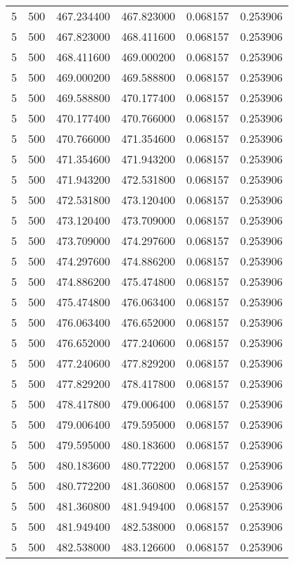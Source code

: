 \begin{longtable}{rrrrrr}
5 & 500 & 467.234400 & 467.823000 & 0.068157 & 0.253906 \\
5 & 500 & 467.823000 & 468.411600 & 0.068157 & 0.253906 \\
5 & 500 & 468.411600 & 469.000200 & 0.068157 & 0.253906 \\
5 & 500 & 469.000200 & 469.588800 & 0.068157 & 0.253906 \\
5 & 500 & 469.588800 & 470.177400 & 0.068157 & 0.253906 \\
5 & 500 & 470.177400 & 470.766000 & 0.068157 & 0.253906 \\
5 & 500 & 470.766000 & 471.354600 & 0.068157 & 0.253906 \\
5 & 500 & 471.354600 & 471.943200 & 0.068157 & 0.253906 \\
5 & 500 & 471.943200 & 472.531800 & 0.068157 & 0.253906 \\
5 & 500 & 472.531800 & 473.120400 & 0.068157 & 0.253906 \\
5 & 500 & 473.120400 & 473.709000 & 0.068157 & 0.253906 \\
5 & 500 & 473.709000 & 474.297600 & 0.068157 & 0.253906 \\
5 & 500 & 474.297600 & 474.886200 & 0.068157 & 0.253906 \\
5 & 500 & 474.886200 & 475.474800 & 0.068157 & 0.253906 \\
5 & 500 & 475.474800 & 476.063400 & 0.068157 & 0.253906 \\
5 & 500 & 476.063400 & 476.652000 & 0.068157 & 0.253906 \\
5 & 500 & 476.652000 & 477.240600 & 0.068157 & 0.253906 \\
5 & 500 & 477.240600 & 477.829200 & 0.068157 & 0.253906 \\
5 & 500 & 477.829200 & 478.417800 & 0.068157 & 0.253906 \\
5 & 500 & 478.417800 & 479.006400 & 0.068157 & 0.253906 \\
5 & 500 & 479.006400 & 479.595000 & 0.068157 & 0.253906 \\
5 & 500 & 479.595000 & 480.183600 & 0.068157 & 0.253906 \\
5 & 500 & 480.183600 & 480.772200 & 0.068157 & 0.253906 \\
5 & 500 & 480.772200 & 481.360800 & 0.068157 & 0.253906 \\
5 & 500 & 481.360800 & 481.949400 & 0.068157 & 0.253906 \\
5 & 500 & 481.949400 & 482.538000 & 0.068157 & 0.253906 \\
5 & 500 & 482.538000 & 483.126600 & 0.068157 & 0.253906 \\

\end{longtable}
